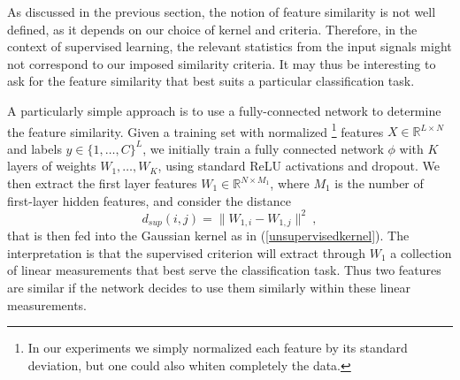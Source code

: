 \documentclass{article} %
\begin{document}
As discussed in the previous section, the notion of feature similarity is not well defined, as it depends on our choice of 
kernel and criteria. Therefore, in the context of supervised learning, the relevant statistics from the input signals might not correspond to 
our imposed similarity criteria. It may thus be interesting to ask for the feature similarity that best suits a particular classification task. 

A particularly simple approach is to use a fully-connected network to determine the feature similarity. Given a training set with normalized \footnote{In our experiments we simply normalized each feature by its standard deviation, but one could also whiten completely the data.} features $X \in \mathbb{R}^{L \times N}$ 
and labels $y \in \{1,\dots,C\}^L$, we initially train a fully connected network $\phi$ with $K$ layers of weights $W_1, \dots, W_K$, using standard ReLU activations and dropout. We then extract the first layer features $W_1 \in \mathbb{R}^{N \times M_1}$, where $M_1$ is the number of first-layer hidden features, and consider the distance
\begin{equation}
\label{supervisedkernel}
d_{sup}(i, j) = \| W_{1,i} - W_{1,j} \|^2~,
\end{equation}
that is then fed into the Gaussian kernel as in (\ref{unsupervisedkernel}). The interpretation is that the supervised criterion will extract through $W_1$ a collection of linear measurements that best serve the classification task. Thus two features are similar if the network decides to use them similarly within these linear measurements.  

\end{document}
